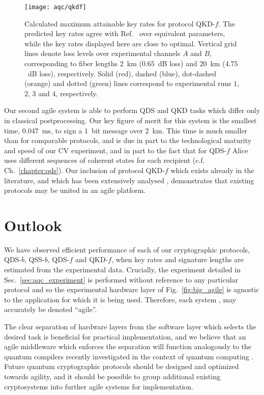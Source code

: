 \begin{figure}[htp]
\centering
\captionsetup{width=0.8\linewidth}
\texttt{[image: aqc/qkdf]}
\caption{\label{fig:aqc_qkdf} Calculated maximum attainable key rates for protocol QKD-$f$. The predicted key rates agree with Ref.~\cite{Papanastasiou2018} over equivalent parameters, while the key rates displayed here are close to optimal. Vertical grid lines denote loss levels over experimental channels $A$ and $B$, corresponding to fiber lengths $2$~km ($0.65$~dB loss) and $20$~km ($4.75$~dB loss), respectively. Solid (red), dashed (blue), dot-dashed (orange) and dotted (green) lines correspond to experimental runs $1$, $2$, $3$ and $4$, respectively.}
\end{figure}


Our second agile system \systemF \; is able to perform QDS and QKD tasks which differ only in classical postprocessing. Our key figure of merit for this system is the smallest time, $0.047$~ms, to sign a $1$~bit message over $2$~km. This time is much smaller than for comparable protocols, and is due in part to the technological maturity and speed of our CV experiment, and in part to the fact that for QDS-$f$ Alice uses different sequences of coherent states for each recipient (c.f. Ch.~\ref{chapter:qds}). Our inclusion of protocol QKD-$f$ which exists already in the literature, and which has been extensively analysed \cite{Leverrier2011, Papanastasiou2018, Ghorai2019, Lin2019}, demonstrates that existing protocols may be united in an agile platform.


\FloatBarrier
\section{Outlook}
We have observed efficient performance of each of our cryptographic protocols, QDS-$b$, QSS-$b$, QDS-$f$ and QKD-$f$, when key rates and signature lengths are estimated from the experimental data. Crucially, the experiment detailed in Sec.~\ref{sec:aqc_experiment} is performed without reference to any particular protocol and so the experimental hardware layer of Fig.~\ref{fig:big_agile} is agnostic to the application for which it is being used. Therefore, each system \systemB, \systemF \; may accurately be denoted ``agile''.

The clear separation of hardware layers from the software layer which selects the desired task is beneficial for practical implementation, and we believe that an agile middleware which enforces the separation will function analogously to the quantum compilers recently investigated in the context of quantum computing \cite{Killoran2018, qiskit, Murali2019}. Future quantum cryptographic protocols should be designed and optimized towards agility, and it should be possible to group additional existing cryptosystems into further agile systems for implementation.


